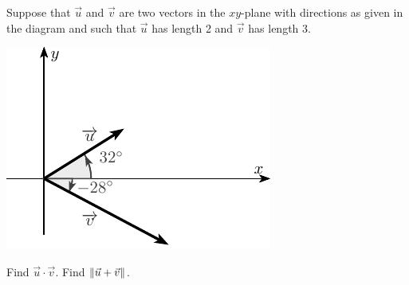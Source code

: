 
\begin{Exercise}[
name={},
title={}, 
difficulty=0,
origin={\cite{MH}}]
Suppose that $\vec u$ and $\vec v$ are two vectors in the $xy$-plane with directions as given in the diagram and such that $\vec u$ has length 2 and $\vec v$ has length 3.
\begin{minipage}[m]{\linewidth}
\centering
\includegraphics[width=\linewidth/2]{vector_geometry/dot_product_and_projections/figures/mh2}
\end{minipage}
\Question Find $\vec u\cdot\vec v$.
\Question Find $\lVert\vec u+\vec v\rVert$.
\end{Exercise}

\begin{Answer}


\end{Answer}

